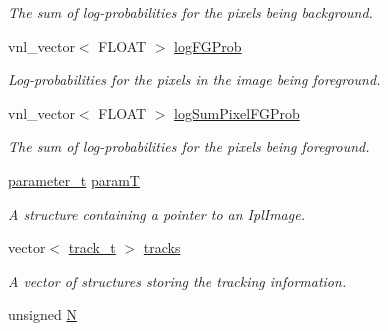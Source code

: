 \begin{DoxyCompactItemize}
\begin{DoxyCompactList}\small\item\em The sum of log-\/probabilities for the pixels being background. \item\end{DoxyCompactList}\item 
\hypertarget{classfindPersonImage_a39e4b4bd141cd13605991d3c30976431}{
vnl\_\-vector$<$ FLOAT $>$ \hyperlink{classfindPersonImage_a39e4b4bd141cd13605991d3c30976431}{logFGProb}}
\label{classfindPersonImage_a39e4b4bd141cd13605991d3c30976431}

\begin{DoxyCompactList}\small\item\em Log-\/probabilities for the pixels in the image being foreground. \item\end{DoxyCompactList}\item 
\hypertarget{classfindPersonImage_a5dba19cc173c5e14c312c82893407051}{
vnl\_\-vector$<$ FLOAT $>$ \hyperlink{classfindPersonImage_a5dba19cc173c5e14c312c82893407051}{logSumPixelFGProb}}
\label{classfindPersonImage_a5dba19cc173c5e14c312c82893407051}

\begin{DoxyCompactList}\small\item\em The sum of log-\/probabilities for the pixels being foreground. \item\end{DoxyCompactList}\item 
\hypertarget{classfindPersonImage_af4f2a0cd670f95418534a9678456c2e3}{
\hyperlink{structparameter__t}{parameter\_\-t} \hyperlink{classfindPersonImage_af4f2a0cd670f95418534a9678456c2e3}{paramT}}
\label{classfindPersonImage_af4f2a0cd670f95418534a9678456c2e3}

\begin{DoxyCompactList}\small\item\em A structure containing a pointer to an {\ttfamily IplImage}. \item\end{DoxyCompactList}\item 
\hypertarget{classfindPersonImage_a0fa099d5bc4bb08195c1d4b0cd2d3f00}{
vector$<$ \hyperlink{structtrack__t}{track\_\-t} $>$ \hyperlink{classfindPersonImage_a0fa099d5bc4bb08195c1d4b0cd2d3f00}{tracks}}
\label{classfindPersonImage_a0fa099d5bc4bb08195c1d4b0cd2d3f00}

\begin{DoxyCompactList}\small\item\em A vector of structures storing the tracking information. \item\end{DoxyCompactList}\item 
\hypertarget{classfindPersonImage_a8cc2e7240164328fdc3f0e5e21032c56}{
unsigned \hyperlink{classfindPersonImage_a8cc2e7240164328fdc3f0e5e21032c56}{N}}
\label{classfindPersonImage_a8cc2e7240164328fdc3f0e5e21032c56}


\end{DoxyCompactItemize}
